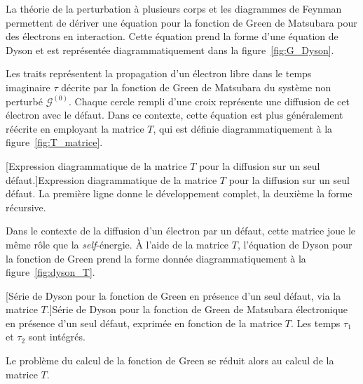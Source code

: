 La théorie de la perturbation à plusieurs corps et les diagrammes de Feynman permettent de dériver une équation pour la fonction de Green de Matsubara pour des électrons en interaction. Cette équation prend la forme d'une équation de Dyson et est représentée diagrammatiquement dans la figure~\ref{fig:G_Dyson}.
\begin{center}
    \vspace{0.5\baselineskip}
    
    \label{fig:G_Dyson}
    \vspace{0.5\baselineskip}
\end{center}
Les traits représentent la propagation d'un électron libre dans le temps imaginaire $\tau$ décrite par la fonction de Green de Matsubara du système non perturbé $\mathcal{G}^{(0)}$. Chaque cercle rempli d'une croix représente une diffusion de cet électron avec le défaut. Dans ce contexte, cette équation est plus généralement réécrite en employant la matrice $T$, qui est définie diagrammatiquement à la figure~\ref{fig:T_matrice}.
\begin{center}
    \vspace{0.5\baselineskip}
    
    [Expression diagrammatique de la matrice $T$ pour la diffusion sur un seul défaut.]{Expression diagrammatique de la matrice $T$ pour la diffusion sur un seul défaut. La première ligne donne le développement complet, la deuxième la forme récursive.}
    \label{fig:T_matrice}
    \vspace{0.5\baselineskip}
\end{center}
Dans le contexte de la diffusion d'un électron par un défaut, cette matrice joue le même rôle que la \textit{self}-énergie. À l'aide de la matrice $T$, l'équation de Dyson pour la fonction de Green prend la forme donnée diagrammatiquement à la figure~\ref{fig:dyson_T}.
\begin{center}
    \vspace{0.5\baselineskip}
    
    [Série de Dyson pour la fonction de Green en présence d'un seul défaut, via la matrice $T$.]{Série de Dyson pour la fonction de Green de Matsubara électronique en présence d'un seul défaut, exprimée en fonction de la matrice $T$. Les temps $\tau_1$ et $\tau_2$ sont intégrés.}
    \label{fig:dyson_T}
    \vspace{0.5\baselineskip}
\end{center}
Le problème du calcul de la fonction de Green se réduit alors au calcul de la matrice $T$.

